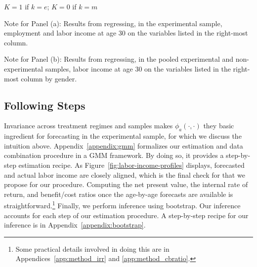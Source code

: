 \begin{table}[!htpb]
\begin{threeparttable}
\begin{tablenotes}
\item * $K = 1$ if $k = e$; $K = 0$ if $k = m$\\
\item Note for Panel (a): Results from regressing, in the experimental sample, employment and labor income at age 30 on the variables listed in the right-most column. \\
\item Note for Panel (b): Results from regressing, in the pooled experimental and non-experimental  samples, labor income at age 30 on the variables listed in the right-most column by gender.
\end{tablenotes}
\end{threeparttable}
\end{table}

\subsection{Following Steps}

\noindent Invariance across treatment regimes and samples makes $\phi_{a} (\cdot, \cdot)$ they basic ingredient for forecasting in the experimental sample, for which we discuss the intuition above. Appendix~\ref{appendix:gmm} formalizes our estimation and data combination procedure in a GMM framework. By doing so, it provides a step-by-step estimation recipe. As Figure~\ref{fig:labor-income-profiles} displays, forecasted and actual labor income are closely aligned, which is the final check for that we propose for our procedure. Computing the net present value, the internal rate of return, and benefit/cost ratios once the age-by-age forecasts are available is straightforward.\footnote{Some practical details involved in doing this are in Appendices~\ref{app:method_irr} and \ref{app:method_cbratio}.} Finally, we perform inference using bootstrap. Our inference accounts for each step of our estimation procedure. A step-by-step recipe for our inference is in Appendix~\ref{appendix:bootstrap}. 

